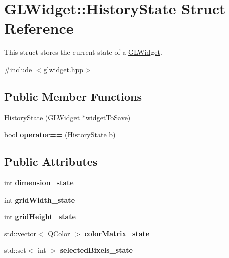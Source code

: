 \hypertarget{structGLWidget_1_1HistoryState}{\section{G\-L\-Widget\-:\-:History\-State Struct Reference}
\label{structGLWidget_1_1HistoryState}
}


This struct stores the current state of a \hyperlink{classGLWidget}{G\-L\-Widget}.  




{\ttfamily \#include $<$glwidget.\-hpp$>$}

\subsection*{Public Member Functions}
\begin{DoxyCompactItemize}
\item 
\hyperlink{structGLWidget_1_1HistoryState_ae299cd96c1489e61d82519333fc19294}{History\-State} (\hyperlink{classGLWidget}{G\-L\-Widget} $\ast$widget\-To\-Save)
\item 
\hypertarget{structGLWidget_1_1HistoryState_aa7b14b8891f4560d7ab1b6e9cc528777}{bool {\bfseries operator==} (\hyperlink{structGLWidget_1_1HistoryState}{History\-State} b)}\label{structGLWidget_1_1HistoryState_aa7b14b8891f4560d7ab1b6e9cc528777}

\end{DoxyCompactItemize}
\subsection*{Public Attributes}
\begin{DoxyCompactItemize}
\item 
\hypertarget{structGLWidget_1_1HistoryState_ae99febc3bc2759952e1870cd3413528d}{int {\bfseries dimension\-\_\-state}}\label{structGLWidget_1_1HistoryState_ae99febc3bc2759952e1870cd3413528d}

\item 
\hypertarget{structGLWidget_1_1HistoryState_a06668527759df59da44a53164526d581}{int {\bfseries grid\-Width\-\_\-state}}\label{structGLWidget_1_1HistoryState_a06668527759df59da44a53164526d581}

\item 
\hypertarget{structGLWidget_1_1HistoryState_a858a0163cdc7072a92b0bb1476d2ea00}{int {\bfseries grid\-Height\-\_\-state}}\label{structGLWidget_1_1HistoryState_a858a0163cdc7072a92b0bb1476d2ea00}

\item 
\hypertarget{structGLWidget_1_1HistoryState_abd095bfba5c17c91295db78686078096}{std\-::vector$<$ Q\-Color $>$ {\bfseries color\-Matrix\-\_\-state}}\label{structGLWidget_1_1HistoryState_abd095bfba5c17c91295db78686078096}

\item 
\hypertarget{structGLWidget_1_1HistoryState_a080e8b35ba02f2218038218f021a3cb2}{std\-::set$<$ int $>$ {\bfseries selected\-Bixels\-\_\-state}}\label{structGLWidget_1_1HistoryState_a080e8b35ba02f2218038218f021a3cb2}

\end{DoxyCompactItemize}


